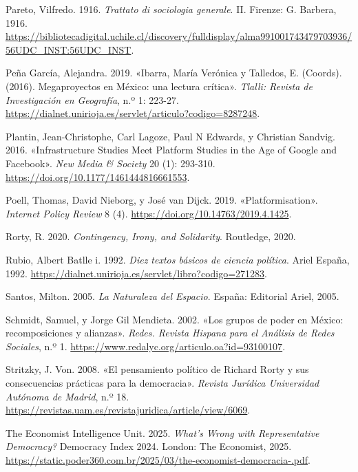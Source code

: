 \documentclass[
  letterpaper,
  DIV=11,
  numbers=noendperiod]{scrreprt}
\newlength{\cslhangindent}
\newenvironment{CSLReferences}[2] %
 {\begin{list}{}{%
  \setlength{\itemindent}{0pt}
  \setlength{\leftmargin}{0pt}
  \setlength{\parsep}{0pt}
  \ifodd #1
   \setlength{\leftmargin}{\cslhangindent}
   \setlength{\itemindent}{-1\cslhangindent}
  \fi
  \setlength{\itemsep}{#2\baselineskip}}}
 {\end{list}}
\begin{document}
\begin{CSLReferences}{1}{1}
Pareto, Vilfredo. 1916. \emph{Trattato di sociologia generale}. II.
Firenze: G. Barbera, 1916.
\url{https://bibliotecadigital.uchile.cl/discovery/fulldisplay/alma991001743479703936/56UDC_INST:56UDC_INST}.

Peña García, Alejandra. 2019. {«Ibarra, María Verónica y Talledos, E.
(Coords). (2016). Megaproyectos en México: una lectura crítica»}.
\emph{Tlalli: Revista de Investigación en Geografía}, n.º 1: 223-27.
\url{https://dialnet.unirioja.es/servlet/articulo?codigo=8287248}.

Plantin, Jean-Christophe, Carl Lagoze, Paul N Edwards, y Christian
Sandvig. 2016. {«Infrastructure Studies Meet Platform Studies in the Age
of Google and Facebook»}. \emph{New Media \& Society} 20 (1): 293-310.
\url{https://doi.org/10.1177/1461444816661553}.

Poell, Thomas, David Nieborg, y José van Dijck. 2019.
{«Platformisation»}. \emph{Internet Policy Review} 8 (4).
\url{https://doi.org/10.14763/2019.4.1425}.

Rorty, R. 2020. \emph{Contingency, Irony, and Solidarity}. Routledge,
2020.

Rubio, Albert Batlle i. 1992. \emph{Diez textos básicos de ciencia
política}. Ariel España, 1992.
\url{https://dialnet.unirioja.es/servlet/libro?codigo=271283}.

Santos, Milton. 2005. \emph{La Naturaleza del Espacio}. España:
Editorial Ariel, 2005.

Schmidt, Samuel, y Jorge Gil Mendieta. 2002. {«Los grupos de poder en
México: recomposiciones y alianzas»}. \emph{Redes. Revista Hispana para
el Análisis de Redes Sociales}, n.º 1.
\url{https://www.redalyc.org/articulo.oa?id=93100107}.

Stritzky, J. Von. 2008. {«El pensamiento político de Richard Rorty y sus
consecuencias prácticas para la democracia»}. \emph{Revista Jurídica
Universidad Autónoma de Madrid}, n.º 18.
\url{https://revistas.uam.es/revistajuridica/article/view/6069}.

The Economist Intelligence Unit. 2025. \emph{What{'}s Wrong with
Representative Democracy?} Democracy Index 2024. London: The Economist,
2025.
\url{https://static.poder360.com.br/2025/03/the-economist-democracia-.pdf}.


\end{CSLReferences}
\end{document}
